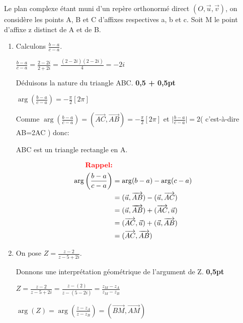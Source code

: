 \documentclass[12pt]{article}
\begin{document}
\begin{enumerate}
			Le plan complexe étant muni d’un repère orthonormé direct $( O, \vec{u} ,\vec{v} )$, on considère les points A, B et C d’affixes respectives a, b et c. Soit M le point d’affixe z distinct de A et de B.
	\begin{enumerate}
		\item Calculons $\frac{b-a}{c-a}$.
		
		$\frac{b-a}{c-a}=\frac{2 - 2i}{2 + 2i}=\frac{(2 - 2i)(2 - 2i)}{4}=-2i$
		
		Déduisons la nature du triangle ABC. \textbf{ 0,5 + 0,5pt}
		
		$\arg\left( \frac{b-a}{c-a} \right) =-\frac{\pi}{2}[2\pi] $
		
		Comme $\arg\left( \frac{b-a}{c-a} \right) =(\overrightarrow{AC},\overrightarrow{AB})=-\frac{\pi}{2}[2\pi] $ et $\mid\frac{b-a}{c-a}\mid=2$( c'est-à-dire AB=2AC ) donc:
		
		ABC est un triangle rectangle en A.
		
		\begin{align*}\textbf{\textcolor{red}{Rappel:}}\\
				\arg\left( \frac{b-a}{c-a} \right) &=\arg(b-a)-\arg(c-a)\\
				&=(\vec{u},\overrightarrow{AB})-(\vec{u},\overrightarrow{AC})\\
				&=(\vec{u},\overrightarrow{AB})+(\overrightarrow{AC},\vec{u})\\
				&=(\overrightarrow{AC},\vec{u})+(\vec{u},\overrightarrow{AB})\\
				&=(\overrightarrow{AC},\overrightarrow{AB})
		\end{align*}

		
		\item On pose $Z=\frac{z-2}{z-5+2i}.$
		
		Donnons une interprétation géométrique de l’argument de Z.\textbf{ 0,5pt}
		
		$Z=\frac{z-2}{z-5+2i}=\frac{z-(2)}{z-(5-2i)}=\frac{z_{M}-z_{A}}{z_{M}-z_{B}}$
		
		$\arg(Z)=\arg(\frac{z-z_{A}}{z-z_{B}})=(\overrightarrow{BM},\overrightarrow{AM})$
  \end{enumerate}
\end{enumerate}
\end{document}
